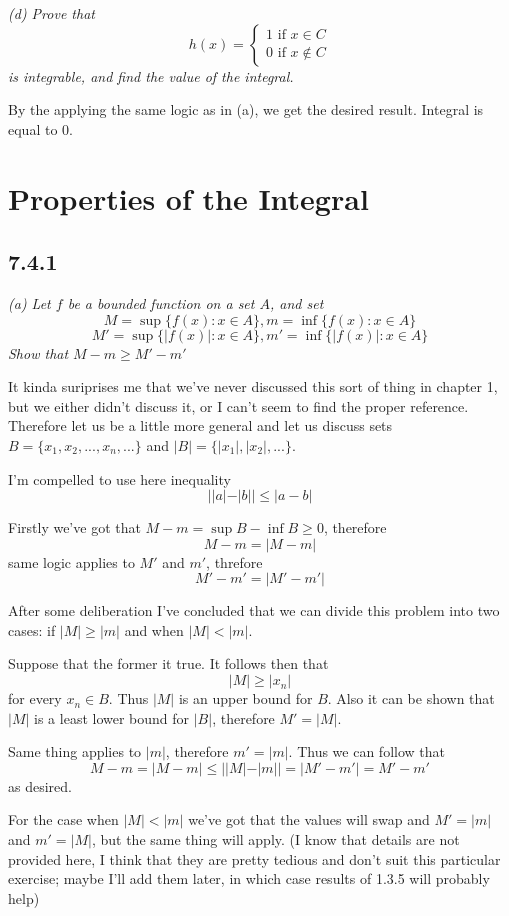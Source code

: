 \documentclass[11pt,oneside,titlepage]{book}
\begin{document}
\textit{(d) Prove that}
$$h(x) =
\begin{cases}
  1 \text{ if } x \in C \\
  0 \text{ if } x \notin C
\end{cases}
$$
\textit{is integrable, and find the value of the integral.}

By the applying the same logic as in (a), we get the desired result. Integral
is equal to 0.

\section{Properties of the Integral}

\subsection*{7.4.1}

\textit{(a) Let $f$ be a bounded function on a set $A$, and set}
$$M = \sup\{f(x): x \in A\}, m = \inf\{f(x): x \in A\}$$
$$M' = \sup\{|f(x)|: x \in A\}, m' = \inf\{|f(x)|: x \in A\}$$
\textit{Show that $M - m \geq M' - m'$}

It kinda suriprises me that we've never discussed this sort of thing
in chapter 1, but we either didn't discuss it, or I can't seem to
find the proper reference. Therefore let us
be a little more general and let us  discuss sets
$B = \{x_1, x_2, ... , x_n, ... \}$ and $|B| = \{|x_1|, |x_2|, ...\}$.

I'm compelled to use here inequality
$$||a| - |b|| \leq |a - b|$$

Firstly we've got that $M - m = \sup B - \inf B \geq 0$,  therefore
$$M - m = |M - m|$$
same logic applies to $M'$ and $m'$, threfore
$$M' - m' = |M' - m'|$$

After some deliberation I've concluded that we can divide this problem
into two cases: if $|M| \geq |m|$ and when $|M| < |m|$.

Suppose that the former it true. It follows then that
$$|M| \geq |x_n|$$ for every $x_n \in B$. Thus $|M|$ is an upper bound for
$B$. Also it can be shown that $|M|$ is a least lower bound for $|B|$,
therefore $M' = |M|$.

Same thing applies to $|m|$, therefore $m' = |m|$. Thus we can follow that
$$M - m = |M - m| \leq ||M| - |m|| = |M' - m'| = M' - m'$$
as desired.

For the case when $|M| < |m|$ we've got that the values will swap
and $M' = |m|$ and $m' = |M|$, but the same thing will apply.
(I know that details are not provided here, I think that
they are pretty tedious
and don't suit this particular exercise; maybe I'll add them later, in which
case results of 1.3.5 will probably help)
\end{document}
